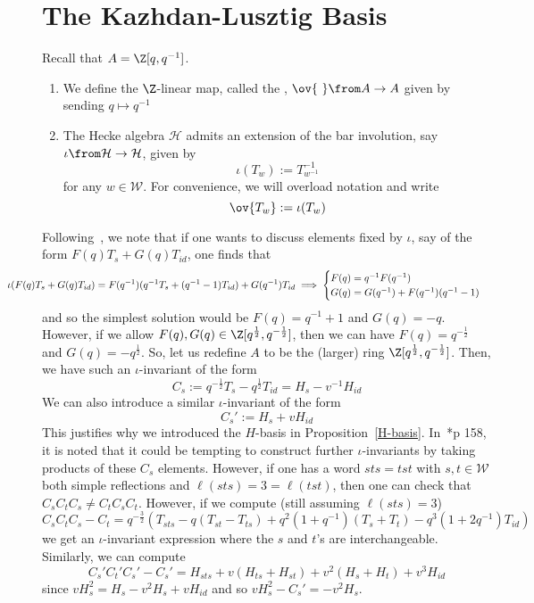 \documentclass[11pt,leqno,oneside]{amsart}
\numberwithin{thm}{section}
\renewcommand{\W}{\mathcal{W}}
\renewcommand{\H}{\mathcal{H}} %
\begin{document}
\section{The Kazhdan-Lusztig Basis}
\begin{defn}
  Recall that \(A = \Z[q,q^{-1}]\).
  \begin{enumerate}
  \item We define the \(\Z\)-linear map, called the , \(\ov{\ } \from A \to A\)
    given by sending \(q \mapsto q^{-1}\)
  \item   The Hecke algebra \(\H\) admits an extension of the bar
    involution, say \(\iota \from \H
  \to \H\), given by \[
    \iota(T_w) := T_{w^{-1}}^{-1}
  \]
  for any \(w \in \W\). For convenience, we will overload notation and
  write \[
    \ov{T_w} := \iota(T_w)
  \]
  \end{enumerate}
\end{defn}
Following~\cite{williamson}, we note that if one wants to discuss elements fixed by \(\iota\), say of the form
\(F(q)T_s + G(q)T_{id}\), one finds that \[
   \hspace{-0.5in}\iota(F(q)T_s + G(q)T_{id}) = F(q^{-1})(q^{-1}T_s+(q^{-1}-1)T_{id})
   + G(q^{-1})T_{id} \implies
   \begin{cases}
     F(q) = q^{-1}F(q^{-1}) \\
     G(q) = G(q^{-1})+F(q^{-1})(q^{-1}-1)
   \end{cases}
 \]
 and so the simplest solution would be \(F(q) = q^{-1}+1\) and
 \(G(q)=-q\). However, if we allow \(F(q),G(q) \in \Z[q^{\frac{1}{2}},
 q^{-\frac{1}{2}}]\), then we can have \(F(q) = q^{-\frac{1}{2}}\) and \(G(q) =
 -q^{\frac{1}{2}}\). So, let us redefine \(A\) to be the (larger) ring
 \(\Z[q^{\frac{1}{2}},q^{-\frac{1}{2}}]\). Then, we have such an \(\iota\)-invariant
 of the form \[
   C_s := q^{-\frac{1}{2}} T_s - q^{\frac{1}{2}} T_{id} = H_s-v^{-1} H_{id}
 \]
 We can also introduce a similar \(\iota\)-invariant of the form \[
   C_s' := H_s+v H_{id}
 \]
 This justifies why we introduced the \(H\)-basis in
 Proposition~\ref{H-basis}. 
 In~\cite{humphreys}*{p 158}, it is noted that it could be tempting to
 construct further \(\iota\)-invariants by taking products of these
 \(C_s\) elements. However, if one has a word \(sts = tst\) with \(s,t
 \in \W\) both simple reflections and \(\ell(sts) = 3 = \ell(tst)\),
 then one can check that \(C_s C_t C_s \neq C_t C_s C_t\). However, if
 we compute (still assuming \(\ell(sts) = 3\))  \[
   C_s C_t C_s - C_t = q^{-\frac{3}{2}}(T_{sts}-q(T_{st}-T_{ts})+q^2(1+q^{-1})(T_s+T_t)-q^3(1+2q^{-1})T_{id})
 \]
 we get an \(\iota\)-invariant expression where the \(s\) and \(t\)'s
 are interchangeable. Similarly, we can compute \[
   C_s' C_t' C_s' - C_s' = H_{sts} + v(H_{ts}+H_{st})+v^2(H_s+H_t) + v^3
   H_{id}
 \]
 since \(vH_s^2 = H_s-v^2H_s+vH_{id}\) and so \(vH_s^2 - C_s' = -v^2 H_s\).
 
\end{document}
